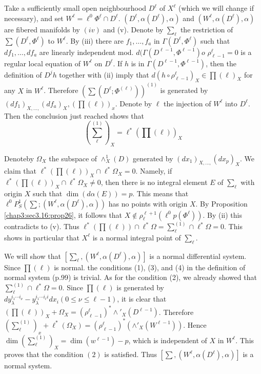 \section{}\label{chap3:sec3.18}%

Take a sufficiently small open neighbourhood $D^\ell$ of $X^\ell$
(which we will change if necessary), and set $W^\ell = \ell ^0 \Phi
^\ell \cap D^\ell$. $(D^\ell, \alpha (D^\ell),\alpha)$ and $(W^\ell ,
\alpha (D^\ell), \alpha)$ are fibered manifolds by $(iv)$ and
(v). Denote by $\sum_\ell$ the restriction of $\sum (D^\ell ,
\Phi^\ell)$ to $W^\ell$. By (iii) there are $f_1,\ldots ,f_a$ in
$\Gamma (D^\ell, \Phi^\ell)$ such that $df_1,\ldots , df_a$ are
linearly independent mod. $d(\Gamma (D^{\ell-1},\Phi^{\ell-1})o$ 
$\rho^{\ell}_{\ell-1}=0$ is a regular local equation of $W^\ell$ on
$D^\ell$. If $h$ is in $\Gamma (D^{\ell-1},\Phi^{\ell-1})$, then the
definition of $D^jh$ together with (ii) imply that $d(h \circ
\rho_{\ell-1}^\ell)_X \in \prod (\ell)_X$ for any $X$ in
$W^\ell$. Therefore $(\sum(D^\ell ; \Phi^{(\ell)})) ^{(1)}$ is
generated by $(df_1) _{X,\ldots ,}(df_a)_X, (\prod(\ell))_x$. Denote
by $\ell$ the injection of $W^\ell$ into $D^\ell$. Then the
conclusion just reached shows that  
$$
\left({\textstyle \sum^{(1)}_\ell}\right)_X = \ell^*\left(\prod(\ell)\right)_X
$$

Denote\pageoriginale by $\Omega_X$ the subspace of $\wedge^1_X(D)$ generated by
$(dx_1)_{X,\ldots,} (dx_p)_X$. We claim that $\ell^* (\prod(\ell))_X
\cap \ell^* \Omega_X = 0$. Namely, if $\ell^* (\prod (\ell))_X \cap
\ell^* \Omega_X \neq 0$, then there is no integral element $E$ of
$\sum_\ell$ with origin $X$ such that $\dim(d\alpha(E))=p$. This means
that $\ell^0 P^1_S (\sum; (W^\ell, \alpha(D^\ell),\alpha))$ has no
points with origin $X$. By Proposition \ref{chap3:sec3.16:prop26}, it follows that $X\notin
\rho^{\ell+1}_\ell (\ell^0 p(\Phi^\ell))$. By (ii) this contradicts to
(v). Thus $\ell^*(\prod(\ell))\cap \ell^* \Omega = \sum ^{(1)}_\ell
\cap \ell^* \Omega =0$. This shows in particular that $X^\ell$ is a
normal integral point of $\sum_\ell$. 

We will show that $\left[\sum_\ell, (W^\ell, \alpha (D^\ell),
  \alpha)\right]$ is a normal differential system. Since $\prod
(\ell)$ is normal. the conditions (1), (3), and (4) in the
definition of normal system (p.99) is trivial. As for the condition
(2), we already showed that $\sum^{(1)}_\ell \cap \ell^* \Omega
=0$. Since $\prod (\ell)$ is generated by $dy^{i_1\cdots
  i_\nu}_{\lambda} - y^{i_1\cdots i_\ell i}_\lambda dx_i (0 \leq \nu
\leq \ell-1)$, it is clear that $(\prod (\ell))_X +\Omega_X =
(\rho^\ell_{\ell -1})^* \wedge'_X (D^{\ell -1})$. Therefore
$(\sum^{(1)}_{\ell})_x + \ell^* (\Omega_X) = (\rho ^{\ell}_{\ell-1})^*
(\wedge'_X (W^{\ell -1}))$. Hence $\dim(\sum^{(1)}_\ell) _X = \dim
(w^{\ell-1})-p$, which is independent of $X$ in $W^\ell$. This proves
that the condition $(2)$ is satisfied. Thus $\left[\sum , (W^\ell,
  \alpha (D^\ell),\alpha)\right]$ is a normal system.  


